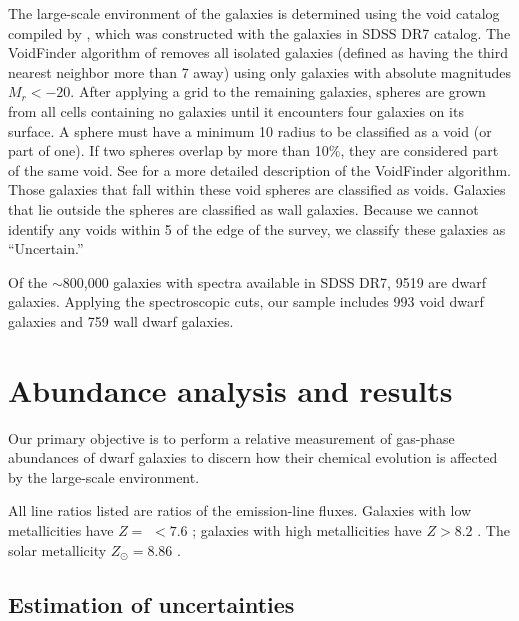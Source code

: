 The large-scale environment of the galaxies is determined using the void catalog 
compiled by \cite{Pan12}, which was constructed with the galaxies in SDSS DR7 
catalog.  The VoidFinder algorithm of \cite{Hoyle02} \citep[based on the 
algorithm described by][]{ElAd97} removes all isolated galaxies (defined as 
having the third nearest neighbor more than 7 \hMpc away) using only galaxies 
with absolute magnitudes $M_r < -20$.  After applying a grid to the remaining 
galaxies, spheres are grown from all cells containing no galaxies until it 
encounters four galaxies on its surface.  A sphere must have a minimum 10 \hMpc 
radius to be classified as a void (or part of one).  If two spheres overlap by 
more than 10\%, they are considered part of the same void.  See \cite{Hoyle02} 
for a more detailed description of the VoidFinder algorithm.  Those galaxies 
that fall within these void spheres are classified as voids.  Galaxies that lie 
outside the spheres are classified as wall galaxies.  Because we cannot identify 
any voids within 5 \hMpc of the edge of the survey, we classify these galaxies 
as ``Uncertain.''

Of the $\sim$800,000 galaxies with spectra available in SDSS DR7, 9519 are 
dwarf galaxies.  Applying the spectroscopic cuts, our sample includes 993 void 
dwarf galaxies and 759 wall dwarf galaxies.


%
%
\section[Results]{Abundance analysis and results}

Our primary objective is to perform a relative measurement of gas-phase 
abundances of dwarf galaxies to discern how their chemical evolution is affected 
by the large-scale environment.

All line ratios listed are ratios of the emission-line fluxes.  Galaxies with 
low metallicities have $Z =$ \OH $< 7.6$ \citep{Pustilnik06}; galaxies with high 
metallicities have $Z > 8.2$ \citep{Pilyugin06}.  The solar metallicity 
$Z_\odot = 8.86$ \citep{Delahaye06}.


\subsection{Estimation of uncertainties}

